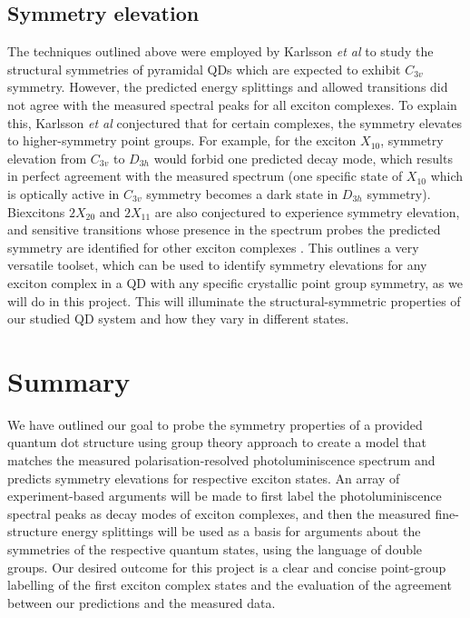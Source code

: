 \documentclass[12pt]{article}
\begin{document}
\subsection{Symmetry elevation}
The techniques outlined above were employed by Karlsson \textit{et al} to study the structural symmetries of pyramidal QDs which are expected to exhibit $C_{3v}$ symmetry. However, the predicted energy splittings and allowed transitions did not agree with the measured spectral peaks for all exciton complexes. To explain this, Karlsson \textit{et al} conjectured that for certain complexes, the symmetry elevates to higher-symmetry point groups. For example, for the exciton $X_{10}$, symmetry elevation from $C_{3v}$ to $D_{3h}$ would forbid one predicted decay mode, which results in perfect agreement with the measured spectrum (one specific state of $X_{10}$ which is optically active in $C_{3v}$ symmetry becomes a dark state in $D_{3h}$ symmetry). Biexcitons $2X_{20}$ and $2X_{11}$ are also conjectured to experience symmetry elevation, and sensitive transitions whose presence in the spectrum probes the predicted symmetry are identified for other exciton complexes \cite{karlsson}. This outlines a very versatile toolset, which can be used to identify symmetry elevations for any exciton complex in a QD with any specific crystallic point group symmetry, as we will do in this project. This will illuminate the structural-symmetric properties of our studied QD system and how they vary in different states.

\section{Summary}
We have outlined our goal to probe the symmetry properties of a provided quantum dot structure using group theory approach to create a model that matches the measured polarisation-resolved photoluminiscence spectrum and predicts symmetry elevations for respective exciton states. An array of experiment-based arguments will be made to first label the photoluminiscence spectral peaks as decay modes of exciton complexes, and then the measured fine-structure energy splittings will be used as a basis for arguments about the symmetries of the respective quantum states, using the language of double groups. Our desired outcome for this project is a clear and concise point-group labelling of the first exciton complex states and the evaluation of the agreement between our predictions and the measured data.
\end{document}
